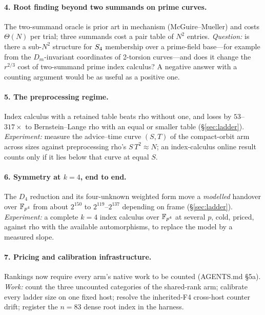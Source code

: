 \paragraph{4. Root finding beyond two summands on prime curves.} The
two-summand oracle is prior art in mechanism (McGuire--Mueller) and costs
$\Theta(N)$ per trial; three summands cost a pair table of $N^2$ entries.
\emph{Question:} is there a sub-$N^2$ structure for $S_{4}$ membership
over a prime-field base---for example from the $D_m$-invariant coordinates
of 2-torsion curves---and does it change the $r^{2/3}$ cost of two-summand
prime index calculus? A negative answer with a counting argument would be
as useful as a positive one.

\paragraph{5. The preprocessing regime.} Index calculus with a retained
table beats rho without one, and loses by $53$--$317\times$ to
Bernstein--Lange rho with an equal or smaller table (\S\ref{sec:ladder}).
\emph{Experiment:} measure the advice--time curve $(S,T)$ of the
compact-orbit arm across sizes against preprocessing rho's
$S\,T^2\approx N$; an index-calculus online result counts only if it lies
below that curve at equal $S$.

\paragraph{6. Symmetry at $k=4$, end to end.} The $D_4$ reduction and its
four-unknown weighted form move a \emph{modelled} handover over $\mathbb{F}_{p^4}$
from about $2^{150}$ to $2^{119}$--$2^{137}$ depending on frame
(\S\ref{sec:ladder}).
\emph{Experiment:} a complete $k=4$ index calculus over $\mathbb{F}_{p^4}$ at
several $p$, cold, priced, against rho with the available automorphisms,
to replace the model by a measured slope.

\paragraph{7. Pricing and calibration infrastructure.} Rankings now
require every arm's native work to be counted (AGENTS.md \S5a).
\emph{Work:} count the three uncounted categories of the shared-rank arm;
calibrate every ladder size on one fixed host; resolve the inherited-F4
cross-host counter drift; register the $n=83$ dense root index in the
harness.

